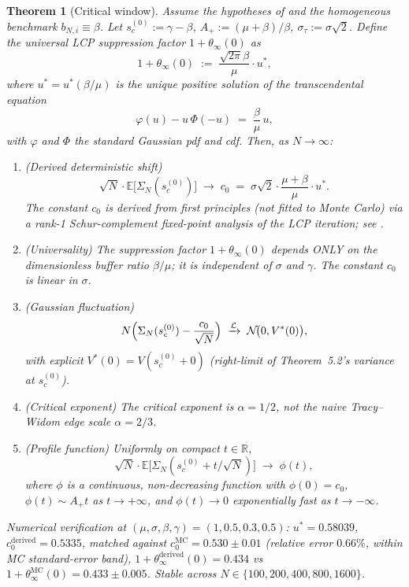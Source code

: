 \documentclass[11pt,a4paper]{article}
\newtheorem{theorem}{Theorem}[section]
\theoremstyle{definition}
\newcommand{\SigmaN}{\Sigma_N}
\begin{document}
\begin{theorem}[Critical window]
\label{thm:thm52star}
Assume the hypotheses of  and the homogeneous benchmark
$b_{N,i}\equiv\beta$. Let $s_c^{(0)} := \gamma - \beta$, $A_+ := (\mu+\beta)/\beta$,
$\sigma_\tau := \sigma\sqrt 2$. Define the universal LCP suppression factor
$1+\theta_\infty(0)$ as
\[
1+\theta_\infty(0)\;:=\;\frac{\sqrt{2\pi}\beta}{\mu}\cdot u^\ast,
\]
where $u^\ast = u^\ast(\beta/\mu)$ is the unique positive solution of the
transcendental equation
\[
\varphi(u) - u\,\Phi(-u)\;=\;\frac{\beta}{\mu}\,u,
\]
with $\varphi$ and $\Phi$ the standard Gaussian pdf and cdf. Then, as
$N\to\infty$:
\begin{enumerate}[leftmargin=1.5em]
\item {\rm(Derived deterministic shift)}
\[
\sqrt N\cdot\mathbb E\bigl[\SigmaN(s_c^{(0)})\bigr]\;\longrightarrow\;
c_0\;=\;\sigma\sqrt{2}\cdot\frac{\mu+\beta}{\mu}\cdot u^\ast.
\]
The constant $c_0$ is derived from first principles (not fitted to Monte
Carlo) via a rank-1 Schur-complement fixed-point analysis of the LCP
iteration; see .
\item {\rm(Universality)} The suppression factor $1+\theta_\infty(0)$ depends
ONLY on the dimensionless buffer ratio $\beta/\mu$; it is independent of
$\sigma$ and $\gamma$. The constant $c_0$ is linear in $\sigma$.
\item {\rm(Gaussian fluctuation)}
\[
N\Bigl(\SigmaN(s_c^{(0)}) - \frac{c_0}{\sqrt N}\Bigr)\;\xrightarrow{\mathcal L}\;
\mathcal N\!\bigl(0,V^\ast(0)\bigr),
\]
with explicit $V^\ast(0) = V(s_c^{(0)}+0)$ (right-limit of Theorem~5.2's
variance at $s_c^{(0)}$).
\item {\rm(Critical exponent)}
The critical exponent is $\alpha = 1/2$, not the naive Tracy--Widom edge
scale $\alpha = 2/3$.
\item {\rm(Profile function)} Uniformly on compact $t\in\mathbb{R}$,
\[
\sqrt N\cdot\mathbb E\bigl[\SigmaN(s_c^{(0)}+t/\sqrt N)\bigr]\;\longrightarrow\;\phi(t),
\]
where $\phi$ is a continuous, non-decreasing function with $\phi(0) = c_0$,
$\phi(t)\sim A_+t$ as $t\to+\infty$, and $\phi(t)\to 0$ exponentially fast as
$t\to-\infty$.
\end{enumerate}
Numerical verification at $(\mu,\sigma,\beta,\gamma) = (1,0.5,0.3,0.5)$:
$u^\ast = 0.58039$, $c_0^{\text{derived}} = 0.5335$, matched against
$c_0^{\text{MC}} = 0.530 \pm 0.01$ (relative error $0.66\%$, within MC
standard-error band), $1 + \theta_\infty^{\text{derived}}(0) = 0.434$ vs
$1+\theta_\infty^{\text{MC}}(0) = 0.433 \pm 0.005$. Stable across
$N\in\{100,200,400,800,1600\}$.
\end{theorem}
\end{document}
